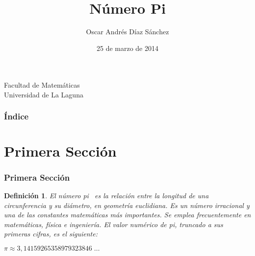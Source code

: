 \documentclass{beamer}
\title[Presentación con Beamer]{Número Pi}
\author[Oscar Andrés Díaz Sánchez]{Oscar Andrés Díaz Sánchez}
\date[25-03-2014]{25 de marzo de 2014}
\newtheorem{definicion}{Definición}
\begin{document}
  
\begin{frame}

  \hspace*{7.0cm}
  \titlepage

  \begin{small}
    \begin{center}
     Facultad de Matemáticas \\
     Universidad de La Laguna
    \end{center}
  \end{small}

\end{frame}

\begin{frame}
  \frametitle{Índice}  
  \tableofcontents[pausesections]
\end{frame}


\section{Primera Sección}


\begin{frame}

\frametitle{Primera Sección}

\begin{definicion}
\alert{El número pi}~\cite{wiki} es la relación entre la longitud de una circunferencia y su diámetro, en geometría euclidiana. Es un número irracional y una de las constantes matemáticas más importantes. Se emplea frecuentemente en matemáticas, física e ingeniería. El valor numérico de pi, truncado a sus primeras cifras, es el siguiente:
\begin{center}
   $\pi \approx 3,14159265358979323846 \; \dots $
\end{center}
\end{definicion}

\end{frame}
\end{document}
